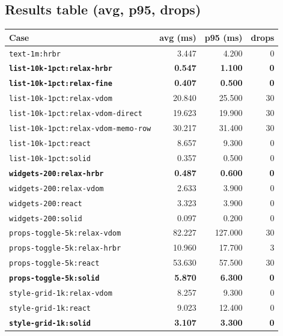 \subsection{Results table (avg, p95, drops)}

\begin{center}
\renewcommand{\arraystretch}{1.15}
\setlength{\tabcolsep}{6pt}
\begin{tabular}{lrrr}
\hline
	\textbf{Case} & \textbf{avg (ms)} & \textbf{p95 (ms)} & \textbf{drops} \\
\hline
			\texttt{text-1m:hrbr} & 3.447 & 4.200 & 0 \\

			\textbf{\texttt{list-10k-1pct:relax-hrbr}} & \textbf{0.547} & \textbf{1.100} & \textbf{0} \\
			\textbf{\texttt{list-10k-1pct:relax-fine}} & \textbf{0.407} & \textbf{0.500} & \textbf{0} \\
			\texttt{list-10k-1pct:relax-vdom} & 20.840 & 25.500 & 30 \\
			\texttt{list-10k-1pct:relax-vdom-direct} & 19.623 & 19.900 & 30 \\
			\texttt{list-10k-1pct:relax-vdom-memo-row} & 30.217 & 31.400 & 30 \\
			\texttt{list-10k-1pct:react} & 8.657 & 9.300 & 0 \\
			\texttt{list-10k-1pct:solid} & 0.357 & 0.500 & 0 \\

			\textbf{\texttt{widgets-200:relax-hrbr}} & \textbf{0.487} & \textbf{0.600} & \textbf{0} \\
			\texttt{widgets-200:relax-vdom} & 2.633 & 3.900 & 0 \\
			\texttt{widgets-200:react} & 3.323 & 3.900 & 0 \\
			\texttt{widgets-200:solid} & 0.097 & 0.200 & 0 \\

			\texttt{props-toggle-5k:relax-vdom} & 82.227 & 127.000 & 30 \\
			\texttt{props-toggle-5k:relax-hrbr} & 10.960 & 17.700 & 3 \\
			\texttt{props-toggle-5k:react} & 53.630 & 57.500 & 30 \\
			\textbf{\texttt{props-toggle-5k:solid}} & \textbf{5.870} & \textbf{6.300} & \textbf{0} \\

			\texttt{style-grid-1k:relax-vdom} & 8.257 & 9.300 & 0 \\
			\texttt{style-grid-1k:react} & 9.023 & 12.400 & 0 \\
			\textbf{\texttt{style-grid-1k:solid}} & \textbf{3.107} & \textbf{3.300} & \textbf{0} \\


\end{tabular}
\end{center}
